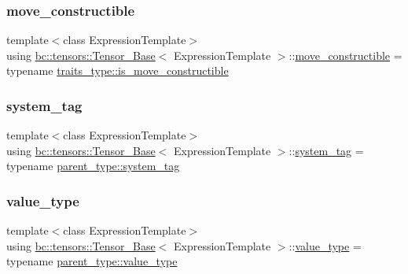 \subsubsection{\texorpdfstring{move\+\_\+constructible}{move\_constructible}}
{\footnotesize\ttfamily template$<$class Expression\+Template$>$ \\
using \hyperlink{classbc_1_1tensors_1_1Tensor__Base}{bc\+::tensors\+::\+Tensor\+\_\+\+Base}$<$ Expression\+Template $>$\+::\hyperlink{classbc_1_1tensors_1_1Tensor__Base_a705cd4c3c18056c0633bd5dd7a2b6691}{move\+\_\+constructible} =  typename \hyperlink{structbc_1_1tensors_1_1exprs_1_1expression__traits_a79f84851dcb50d4b56daa25301a3f9fb}{traits\+\_\+type\+::is\+\_\+move\+\_\+constructible}}

\mbox{\label{classbc_1_1tensors_1_1Tensor__Base_aef100d466be9075c6682ae9a2d2bd66d}} 
\subsubsection{\texorpdfstring{system\+\_\+tag}{system\_tag}}
{\footnotesize\ttfamily template$<$class Expression\+Template$>$ \\
using \hyperlink{classbc_1_1tensors_1_1Tensor__Base}{bc\+::tensors\+::\+Tensor\+\_\+\+Base}$<$ Expression\+Template $>$\+::\hyperlink{classbc_1_1tensors_1_1Expression__Base_a7c54328db22f61f881e7607b5a69b8e5}{system\+\_\+tag} =  typename \hyperlink{classbc_1_1tensors_1_1Expression__Base_a7c54328db22f61f881e7607b5a69b8e5}{parent\+\_\+type\+::system\+\_\+tag}}

\mbox{\label{classbc_1_1tensors_1_1Tensor__Base_ae7e5c0119f62f43ef74c5a463d3eaf13}} 
\subsubsection{\texorpdfstring{value\+\_\+type}{value\_type}}
{\footnotesize\ttfamily template$<$class Expression\+Template$>$ \\
using \hyperlink{classbc_1_1tensors_1_1Tensor__Base}{bc\+::tensors\+::\+Tensor\+\_\+\+Base}$<$ Expression\+Template $>$\+::\hyperlink{classbc_1_1tensors_1_1Expression__Base_acda5b4e228c9b3cb9174258d5caf860a}{value\+\_\+type} =  typename \hyperlink{classbc_1_1tensors_1_1Expression__Base_acda5b4e228c9b3cb9174258d5caf860a}{parent\+\_\+type\+::value\+\_\+type}}



